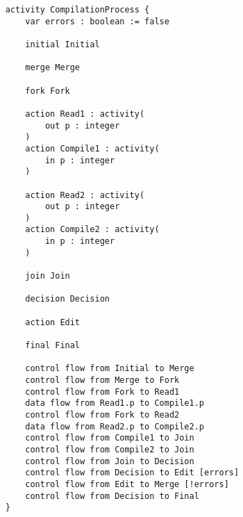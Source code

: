 \begin{lstlisting}
	activity CompilationProcess {
		var errors : boolean := false
		
		initial Initial
		
		merge Merge
		
		fork Fork
		
		action Read1 : activity(
			out p : integer
		)
		action Compile1 : activity(
			in p : integer
		)
		
		action Read2 : activity(
			out p : integer
		)
		action Compile2 : activity(
			in p : integer
		)
		
		join Join
		
		decision Decision
		
		action Edit
		
		final Final
		
		control flow from Initial to Merge 
		control flow from Merge to Fork 
		control flow from Fork to Read1 
		data flow from Read1.p to Compile1.p
		control flow from Fork to Read2 
		data flow from Read2.p to Compile2.p
		control flow from Compile1 to Join 
		control flow from Compile2 to Join 
		control flow from Join to Decision 
		control flow from Decision to Edit [errors]
		control flow from Edit to Merge [!errors]
		control flow from Decision to Final
	}	
\end{lstlisting}

